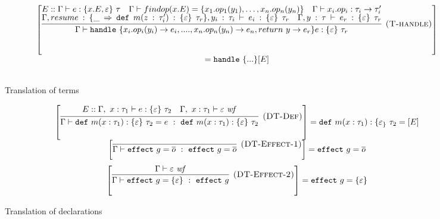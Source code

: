 \documentclass{article}
\newcommand{\keywadj}[1]{\mathtt{#1}}
\newcommand{\keyw}[1]{\keywadj{#1}~}
\begin{document}
\begin{figure}[H]
{\[\begin{array}{cc}
\left[  \infer[\textsc{(T-handle)}]
  {\Gamma \vdash \keyw{handle} \{x_i.op_i(y_i)\rightarrow e_i, ...., x_n.op_n(y_n)\rightarrow e_n, return\ y\rightarrow e_r\} e: \{\varepsilon\}\ \tau_r }
  {E::\Gamma \vdash e: \{x.E, \varepsilon\}\ \tau \quad 
  \Gamma \vdash findop(x.E) = \{ x_1.op_1(y_1), \dots, x_n.op_n(y_n)\} \quad
   \Gamma \vdash x_i.op_i : \tau_i \rightarrow \tau_i'\\  
   \Gamma, resume: \{\_ \Rightarrow \keyw{def} m(z: \tau_i') : \{\varepsilon\}\ \tau_r\} , y_i:\tau_i \vdash e_i: \{\varepsilon\}\ \tau_r \quad \Gamma, y:\tau \vdash e_r: \{\varepsilon\}\ \tau_r
  }\right] \\= \keyw{handle}\{...\}[E]\\[3ex]
\end{array}
\]
}


\caption{Translation of terms}
\label{f-declarative}
\end{figure}

\begin{figure}[H]
\flushleft
\footnotesize{
\[
  \begin{array}{cc}
  
 \left[
\infer[\textsc{(DT-Def)}]
  {\Gamma \vdash \keyw{def} m(x : \tau_1) : \{ \varepsilon \}~\tau_2 = e~:~\keyw{def} m(x : \tau_1) : \{ \varepsilon \}~\tau_2}
  {\begin{gathered} E :: \Gamma,~x : \tau_1 \vdash e : \{ \varepsilon \}~\tau_2\quad\Gamma,~x : \tau_1 \vdash \varepsilon~\mathit{wf} \end{gathered}} 
  \right] = \keyw{def} m(x : \tau_1) : \{ \varepsilon_\}~\tau_2 = [E]
  \\[3ex]


\left[
\infer[\textsc{(DT-Effect-1)}]
  {\Gamma \vdash \keyw{effect} g = \overline{o} ~:~\keyw{effect} g = \overline{o}}
  {}
  
  \right] = \keyw{effect} g = \overline{o}
\\[3ex]


\left[
\infer[\textsc{(DT-Effect-2)}]
  {\Gamma \vdash \keyw{effect} g = \{ \varepsilon \}~:~\keyw{effect} g }
  {\Gamma \vdash \varepsilon~\mathit{wf}}
  
  \right] = \keyw{effect} g = \{ \varepsilon \}
\\[3ex]
\end{array}
\]



}
\caption{Translation of declarations}
\label{f-effects-subtyping-rules}
\end{figure}
\end{document}
